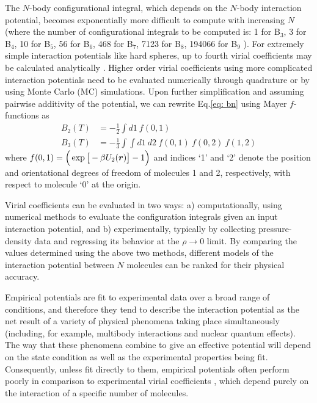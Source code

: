         The $N$-body configurational integral, which depends on the $N$-body interaction potential, becomes exponentially more difficult to compute with increasing $N$ (where the number of configurational integrals to be computed is: 1 for B$_3$, 3 for B$_4$, 10 for B$_5$, 56 for B$_6$, 468 for B$_7$, 7123 for B$_8$, 194066 for B$_9$ \cite{ShaulPhD,Masters2008,Labik2005}). For extremely simple interaction potentials like hard spheres, up to fourth virial coefficients may be calculated analytically \cite{Masters2008}. Higher order virial coefficients using more complicated interaction potentials need to be evaluated numerically through quadrature or by using Monte Carlo (MC) simulations. Upon further simplification and assuming pairwise additivity of the potential, we can rewrite Eq.\eqref{eq: bn} using Mayer $f$-functions as \cite{Masters2008,Hansen}
        \begin{equation} \label{eq: mayerfn}
            \begin{aligned}
                B_2(T) &= -\frac{1}{2} \displaystyle\int d1 ~ f(0,1)\\
                B_3(T) &= -\frac{1}{3} \displaystyle\int \int d1~d2~f(0,1)~f(0,2)~f(1,2)
            \end{aligned}
        \end{equation}
        where $f(0,1) = \Big( \exp \big[ -\beta U_2({\boldsymbol {r}}) \big] - 1 \Big) $ and indices `1' and `2' denote the position and orientational degrees of freedom of molecules 1 and 2, respectively, with respect to molecule `0' at the origin.

        Virial coefficients can be evaluated in two ways: a) computationally, using numerical methods to evaluate the configuration integrals given an input interaction potential, and b) experimentally, typically by collecting pressure-density data and regressing its behavior at the $\rho \to 0$ limit. By comparing the values determined using the above two methods, different models of the interaction potential between $N$ molecules can be ranked for their physical accuracy.

        Empirical potentials are fit to experimental data over a broad range of conditions, and therefore they tend to describe the interaction potential as the net result of a variety of physical phenomena taking place simultaneously (including, for example, multibody interactions and nuclear quantum effects). The way that these phenomena combine to give an effective potential will depend on the state condition as well as the experimental properties being fit. Consequently, unless fit directly to them, empirical potentials often perform poorly in comparison to experimental virial coefficients \cite{Benjamin2007}, which depend purely on the interaction of a specific number of molecules.

